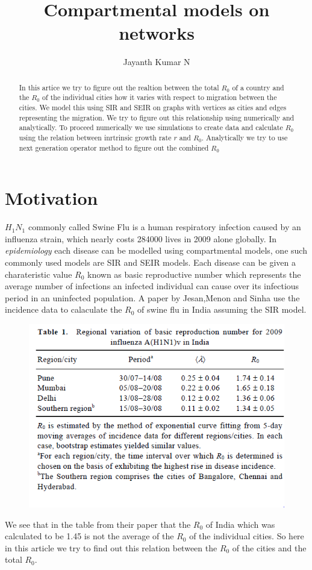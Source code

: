 \documentclass{article}
\begin{document}
\author{Jayanth Kumar N}
\title{\textbf{Compartmental models on networks}}
\maketitle

\begin{abstract}
   In this artice we try to figure out the realtion between the total
   $R_{0}$ of a country and the $R_{0}$ of the individual cities how
   it varies with respect to migration between the cities. We model
   this using SIR and SEIR on graphs with vertices as cities and edges
   representing the migration. We try to figure out this relationship
   using numerically and analytically. To proceed numerically we use
   simulations to create data and calculate $R_{0}$ using the relation
   between inrtrinsic growth rate $r$ and $R_{0}$. Analytically we try
   to use next generation operator method to figure out the combined
   $R_{0}$
\end{abstract}

\section{Motivation}
$H_{1}N_{1}$ commonly called Swine Flu is a human respiratory
infection caused by an influenza strain, which nearly costs 284000
lives in 2009 alone globally. In \textit{epidemiology} each disease
can be modelled using compartmental models, one such commonly used
models are SIR and SEIR models. Each disease can be given a
charateristic value $R_{0}$ known as basic reproductive number which
represents the average number of infections an infected individual can
cause over its infectious period in an uninfected population. A paper
by Jesan,Menon and Sinha use the incidence data to calaculate the
$R_{0}$ of swine flu in India assuming the SIR model.
\begin{figure}[h]
  \centering
\includegraphics[scale=0.5]{table1}
\end{figure}
We see that in the table from their paper that the $R_{0}$ of India
which was calculated to be 1.45 is not the average of the $R_{0}$ of
the individual cities. So here in this article we try to find out this
relation between the $R_{0}$ of the cities and the total $R_{0}$.
\end{document}
